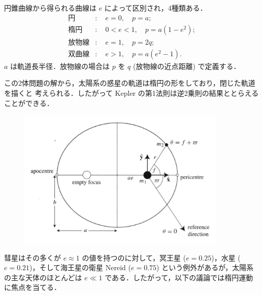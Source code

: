 \documentclass[11pt,a4paper,oneside,onecolumn]{jreport}
\begin{document}
円錐曲線から得られる曲線は $e$ によって区別され，4種類ある．
\begin{equation}
\begin{split}
円 &: \quad e = 0, \quad p = a; \\
楕円 &: \quad 0 < e < 1, \quad p = a(1-e^2); \\
放物線 &: \quad e = 1, \quad p = 2q; \\
双曲線 &: \quad e > 1, \quad p = a(e^2-1). 
\end{split}
\end{equation}
$a$ は軌道長半径．放物線の場合は $p$ を $q$ (放物線の近点距離) で定義する．

この2体問題の解から，太陽系の惑星の軌道は楕円の形をしており，閉じた軌道を描くと
考えられる．したがって Kepler の第1法則は逆2乗則の結果ととらえることができる．

\begin{figure}[H]
\centering
\includegraphics[width=10cm]{./image/sec2_5.pdf}
\caption{\label{fig:ellipse}}
\end{figure}

彗星はその多くが $e \approx 1$ の値を持つのに対して，冥王星 ($e = 0.25$)，水星 ($e = 0.21$)，そして海王星の衛星 Nereid ($e = 0.75$) という例外があるが，太陽系の主な天体のほとんどは $e \ll 1$ である．したがって，以下の議論では楕円運動に焦点を当てる．
\end{document}

